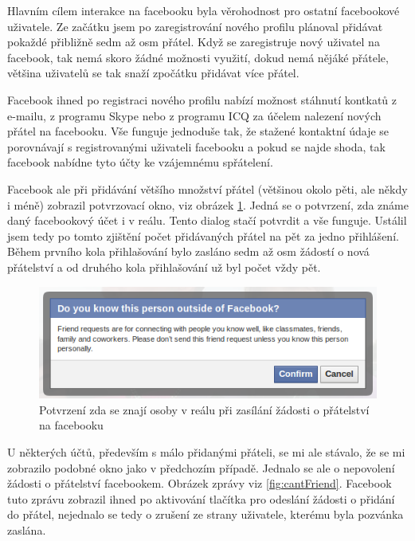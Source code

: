 \documentclass[thesis=M,czech]{FITthesis}[2013/05/10]
\begin{document}
Hlavním cílem interakce na facebooku byla věrohodnost pro ostatní facebookové uživatele. Ze začátku jsem po zaregistrování nového profilu plánoval přidávat pokaždé přibližně sedm až osm přátel. Když se zaregistruje nový uživatel na facebook, tak nemá skoro žádné možnosti využití, dokud nemá nějáké přátele, většina uživatelů se tak snaží zpočátku přidávat více přátel. 

Facebook ihned po registraci nového profilu nabízí možnost stáhnutí kontkatů z e-mailu, z programu Skype nebo z programu ICQ za účelem nalezení nových přátel na facebooku. Vše funguje jednoduše tak, že stažené kontaktní údaje se porovnávají s registrovanými uživateli facebooku a pokud se najde shoda, tak facebook nabídne tyto účty ke vzájemnému spřátelení.

Facebook ale při přidávání většího množství přátel (většinou okolo pěti, ale někdy i méně) zobrazil potvrzovací okno, viz obrázek \ref{fig:confirmFriendship}. Jedná se o potvrzení, zda známe daný facebookový účet i v reálu. Tento dialog stačí potvrdit a vše funguje. Ustálil jsem tedy po tomto zjištění počet přidávaných přátel na pět za jedno přihlášení. Během prvního kola přihlašování bylo zasláno sedm až osm žádostí o nová přátelství a od druhého kola přihlašování už byl počet vždy pět.

\begin{figure}[h]
\begin{center}
\includegraphics[width=5in]{figures/confirm-friendship.png}
\caption{Potvrzení zda se znají osoby v reálu při zasílání žádosti o přátelství na facebooku}
\label{fig:confirmFriendship}
\end{center}
\end{figure}

U některých účtů, především s málo přidanými přáteli, se mi ale stávalo, že se mi zobrazilo podobné okno jako v předchozím případě. Jednalo se ale o nepovolení žádosti o přátelství facebookem. Obrázek zprávy viz \ref{fig:cantFriend}. Facebook tuto zprávu zobrazil ihned po aktivování tlačítka pro odeslání žádosti o přidání do přátel, nejednalo se tedy o zrušení ze strany uživatele, kterému byla pozvánka zaslána.
\end{document}
